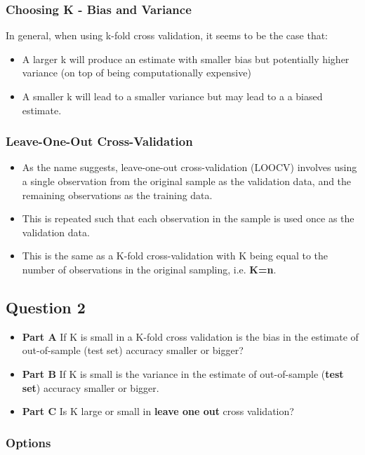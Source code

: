 \documentclass[caret-main.tex]{subfiles}
\begin{document}
\subsubsection*{Choosing K - Bias and Variance}
In general, when using k-fold cross validation, it seems to be the case that:
\begin{itemize}
\item A larger k will produce an estimate with smaller bias but potentially higher variance (on top of being computationally expensive)
\item A smaller k will lead to a smaller variance but may lead to a a biased estimate.
\end{itemize}

\subsubsection*{Leave-One-Out Cross-Validation}
\begin{itemize}
\item As the name suggests, leave-one-out cross-validation (LOOCV) involves using a single observation from the original sample as the validation data, and the remaining observations as the training data. 
\item This is repeated such that each observation in the sample is used once as the validation data. 
\item This is the same as a K-fold cross-validation with K being equal to the number of observations in the original sampling, i.e. \textbf{K=n}.
\end{itemize}

\newpage

\subsection*{Question 2}
\begin{itemize}
\item \textbf{Part A} If K is small in a K-fold cross validation is the bias in the estimate of
out-of-sample (test set) accuracy smaller or bigger? 
\item \textbf{Part B} If K is small is the
variance in the estimate of out-of-sample (\textbf{test set}) accuracy smaller or bigger.
\item \textbf{Part C} Is K large or small in \textbf{leave one out} cross validation?
\end{itemize}
\subsubsection*{Options}
\end{document}
